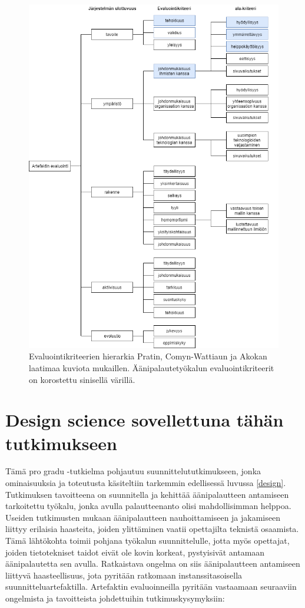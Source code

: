 \documentclass[utf8]{gradu3}
\begin{document}
\begin{figure}[H]\centering
{}
  \includegraphics[width=\textwidth,height=\textheight,keepaspectratio]{evaluointikriteerit}
  \caption[]{Evaluointikriteerien hierarkia Pratin, Comyn-Wattiaun ja Akokan \parencite{evaluation} laatimaa kuviota mukaillen. Äänipalautetyökalun evaluointikriteerit on korostettu sinisellä värillä.}
  \label{fig:evaluointikriteerit}
\restoregeometry
\end{figure}

\section{Design science sovellettuna tähän tutkimukseen}

Tämä pro gradu -tutkielma pohjautuu suunnittelututkimukseen, jonka ominaisuuksia ja toteutusta käsiteltiin tarkemmin edellisessä luvussa \ref{design}. Tutkimuksen tavoitteena on suunnitella ja kehittää äänipalautteen antamiseen tarkoitettu työkalu, jonka avulla palautteenanto olisi mahdollisimman helppoa. Useiden tutkimusten mukaan äänipalautteen nauhoittamiseen ja jakamiseen liittyy erilaisia haasteita, joiden ylittäminen vaatii opettajilta teknistä osaamista. Tämä lähtökohta toimii pohjana työkalun suunnittelulle, jotta myös opettajat, joiden tietotekniset taidot eivät ole kovin korkeat, pystyisivät antamaan äänipalautetta sen avulla. Ratkaistava ongelma on siis äänipalautteen antamiseen liittyvä haasteellisuus, jota pyritään ratkomaan instanssitasoisella suunnitteluartefaktilla. Artefaktin evaluoinneilla pyritään vastaamaan seuraaviin ongelmista ja tavoitteista johdettuihin tutkimuskysymyksiin:
\end{document}
